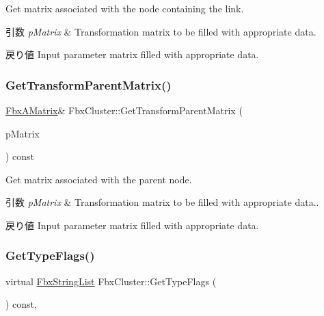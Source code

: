 Get matrix associated with the node containing the link. 
\begin{DoxyParams}{引数}
{\em p\+Matrix} & Transformation matrix to be filled with appropriate data. \\
\hline
\end{DoxyParams}
\begin{DoxyReturn}{戻り値}
Input parameter matrix filled with appropriate data. 
\end{DoxyReturn}
\mbox{\label{class_fbx_cluster_a715efef69d8dab149415c7b47a1257bc}} 
\subsubsection{\texorpdfstring{Get\+Transform\+Parent\+Matrix()}{GetTransformParentMatrix()}}
{\footnotesize\ttfamily \hyperlink{class_fbx_a_matrix}{Fbx\+A\+Matrix}\& Fbx\+Cluster\+::\+Get\+Transform\+Parent\+Matrix (\begin{DoxyParamCaption}\item[{\hyperlink{class_fbx_a_matrix}{Fbx\+A\+Matrix} \&}]{p\+Matrix }\end{DoxyParamCaption}) const}

Get matrix associated with the parent node. 
\begin{DoxyParams}{引数}
{\em p\+Matrix} & Transformation matrix to be filled with appropriate data.. \\
\hline
\end{DoxyParams}
\begin{DoxyReturn}{戻り値}
Input parameter matrix filled with appropriate data. 
\end{DoxyReturn}
\mbox{\label{class_fbx_cluster_af989ca14bdf9e025f3db49183dc09811}} 
\subsubsection{\texorpdfstring{Get\+Type\+Flags()}{GetTypeFlags()}}
{\footnotesize\ttfamily virtual \hyperlink{class_fbx_string_list}{Fbx\+String\+List} Fbx\+Cluster\+::\+Get\+Type\+Flags (\begin{DoxyParamCaption}{ }\end{DoxyParamCaption}) const\hspace{0.3cm}{\ttfamily [protected]}, {\ttfamily [virtual]}}



